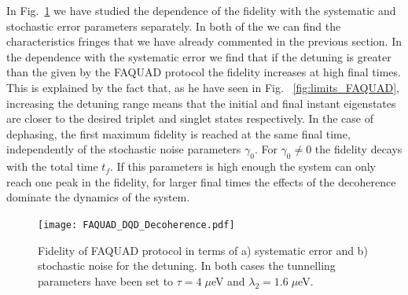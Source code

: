 \documentclass[a4paper,11pt]{article}
\begin{document}
In Fig.~\ref{fig:FAQUAD_DQD_errors} we have studied the dependence of the fidelity with the systematic and stochastic error parameters separately. In both of the we can find the characteristics fringes that we have already commented in the previous section. In the dependence with the systematic error we find that if the detuning is greater than the given by the FAQUAD protocol the fidelity increases at high final times. This is explained by the fact that, as he have seen in Fig.~ \ref{fig:limits_FAQUAD}, increasing the detuning range means that the initial and final instant eigenstates are closer to the desired triplet and singlet states respectively. In the case of dephasing, the first maximum fidelity is reached at the same final time, independently of the stochastic noise parameters $\gamma_0$. For $\gamma_0\neq 0$ the fidelity decays with the total time $t_f$. If this parameters is high enough the system can only reach one peak in the fidelity, for larger final times the effects of the decoherence  dominate the dynamics of the system.
\begin{figure}[!htbp]
	\centering
	\texttt{[image: FAQUAD\_DQD\_Decoherence.pdf]}
	\caption{Fidelity of FAQUAD protocol in terms of a) systematic error and b) stochastic noise for the detuning. In both cases the tunnelling parameters have been set to $\tau=4\; \mu$eV and $\lambda_{2}=1.6\; \mu$eV.}
	\label{fig:FAQUAD_DQD_errors}
\end{figure}
\newpage
\appendix
\end{document}
